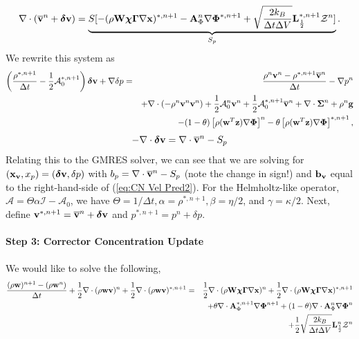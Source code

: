 \documentclass[final]{siamltex}
\def\Ab {{\bf A}}
\def\bb {{\bf b}}
\def\gb {{\bf g}}
\def\Lb {{\bf L}}
\def\vb {{\bf v}}
\def\wb {{\bf w}}
\def\Wb {{\bf W}}
\def\xb {{\bf x}}
\def\zb {{\bf z}}
\def\chib   {\boldsymbol{\chi}}
\def\deltab {\boldsymbol{\delta}}
\def\Gammab {\boldsymbol{\Gamma}}
\def\Phib   {\boldsymbol{\Phi}}
\def\Sigmab {\boldsymbol{\Sigma}}
\def\half   {\frac{1}{2}}
\begin{document}
{\begin{eqnarray}
\end{eqnarray}
\begin{equation}
\nabla\cdot(\overline\vb^n+\deltab\vb) = \underbrace{S[-(\rho\Wb\chib\Gammab\nabla\xb)^{*,n+1} - \Ab_\Phi^n\nabla\Phib^{*,n+1} + \sqrt{\frac{2k_B}{\Delta t\Delta V}}\Lb_\half^{*,n+1}\mathcal{Z}^n]}_{S_p}.
\end{equation}
We rewrite this system as
\begin{eqnarray}
\left(\frac{\rho^{*,n+1}}{\Delta t} - \half\mathcal{A}_0^{*,n+1}\right)\deltab\vb + \nabla\delta p &=& \frac{\rho^n\vb^n-\rho^{*,n+1}\overline\vb^n}{\Delta t} -\nabla p^n\nonumber\\
&&+ \nabla\cdot(-\rho^n\vb^n\vb^n) + \half\mathcal{A}_0^n\vb^n + \half\mathcal{A}_0^{*,n+1}\overline\vb^n + \nabla\cdot\Sigmab^n + \rho^n\gb\nonumber\\
&&- (1-\theta)\left[\rho(\wb^T\zb)\nabla\Phib\right]^n - \theta\left[\rho(\wb^T\zb)\nabla\Phib\right]^{*,n+1},\label{eq:CN Vel Pred2}
\end{eqnarray}
\begin{equation}
-\nabla\cdot\deltab\vb = \nabla\cdot\overline\vb^n - S_p
\end{equation}
Relating this to the GMRES solver, we can see that we are solving for 
$(\xb_\vb,x_p) = (\deltab\vb,\delta p)$ with $b_p = \nabla\cdot\overline\vb^n-S_p$ (note the change in sign!) 
and $\bb_\vb$ equal to the right-hand-side of (\ref{eq:CN Vel Pred2}).  For the Helmholtz-like operator, 
$\mathcal{A}=\Theta\alpha\mathcal{I} - \mathcal{A}_0$, we have $\Theta=1/\Delta t, \alpha=\rho^{*,n+1}, 
\beta=\eta/2$, and $\gamma=\kappa/2$.
Next, define $\vb^{*,n+1} = \overline\vb^n + \deltab\vb$ and $p^{*,n+1} = p^n + \delta p$.\\ \\
{\bf Step 3: Corrector Concentration Update}\\ \\
We would like to solve the following,
\begin{eqnarray}
\frac{(\rho\wb)^{n+1} - (\rho\wb^n)}{\Delta t} + \half\nabla\cdot(\rho\wb\vb)^n + \half\nabla\cdot(\rho\wb\vb)^{*,n+1} &=&\half\nabla\cdot(\rho\Wb\chib\Gammab\nabla\xb)^n + \half\nabla\cdot(\rho\Wb\chib\Gammab\nabla\xb)^{*,n+1} \nonumber\\
&&\hspace{-2in} + \theta\nabla\cdot \Ab_\Phi^{*,n+1}\nabla\Phib^{n+1} +
(1-\theta)\nabla\cdot \Ab_\Phi^n\nabla\Phib^n\nonumber\\
&&\hspace{-2in} + \half\sqrt{\frac{2k_B}{\Delta t\Delta V}}\Lb_\half^n\mathcal{Z}^n

\end{eqnarray}}
\end{document}
